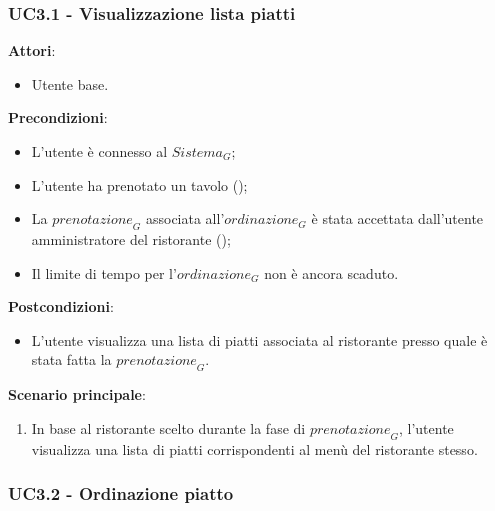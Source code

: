 \subsubsection{UC3.1 - Visualizzazione lista piatti }\label{usecase:3_1}

\textbf{Attori}:
\begin{itemize}
    \item Utente base.
\end{itemize}
\textbf{Precondizioni}:
\begin{itemize}
    \item L'utente è connesso al $\textit{Sistema}_G$; 
    \item L'utente ha prenotato un tavolo ();
    \item La $\textit{prenotazione}_G$ associata all'$\textit{ordinazione}_G$ è stata accettata dall'utente amministratore del ristorante ();
    \item Il limite di tempo per l'$\textit{ordinazione}_G$ non è ancora scaduto.
\end{itemize}
\textbf{Postcondizioni}:
\begin{itemize}
    \item L'utente visualizza una lista di piatti associata al ristorante presso quale è stata fatta la $\textit{prenotazione}_G$.
\end{itemize}
\textbf{Scenario principale}:
\begin{enumerate}
    \item In base al ristorante scelto durante la fase di $\textit{prenotazione}_G$, l'utente visualizza una lista di piatti corrispondenti al menù del ristorante stesso.
\end{enumerate}

\subsubsection{UC3.2 - Ordinazione piatto}\label{usecase:3_2}

